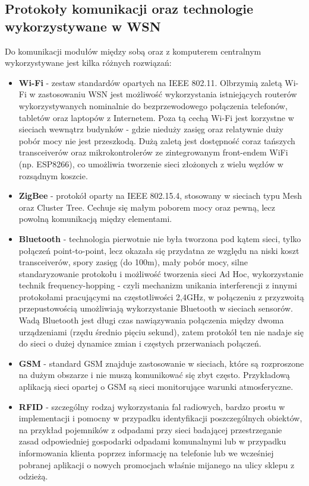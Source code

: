 \documentclass[12pt, twoside, hidelinks, a4paper]{article}
\begin{document}
\subsection{Protokoły komunikacji oraz technologie wykorzystywane w WSN}
Do komunikacji modułów między sobą oraz z komputerem centralnym wykorzystywane jest kilka różnych rozwiązań:
\begin{itemize}
\item \textbf{Wi-Fi}  - zestaw standardów opartych na IEEE 802.11. Olbrzymią zaletą Wi-Fi w zastosowaniu WSN jest możliwość wykorzystania istniejących routerów wykorzystywanych nominalnie do bezprzewodowego połączenia telefonów, tabletów oraz laptopów z Internetem. Poza tą cechą Wi-Fi jest korzystne w sieciach wewnątrz budynków - gdzie nieduży zasięg oraz relatywnie duży pobór mocy nie jest przeszkodą. Dużą zaletą jest dostępność coraz tańszych transceiverów oraz mikrokontrolerów ze zintegrowanym front-endem WiFi (np. ESP8266), co umożliwia tworzenie sieci złożonych z wielu węzłów w rozsądnym koszcie.\cite{c2}\cite{c14}\cite{c15}
\item \textbf{ZigBee} - protokół oparty na IEEE 802.15.4, stosowany w sieciach typu Mesh oraz Cluster Tree. Cechuje się małym poborem mocy oraz pewną, lecz powolną komunikacją między elementami.\cite{c6}\cite{c12}
\item \textbf{Bluetooth} - technologia pierwotnie nie była tworzona pod kątem sieci, tylko połączeń point-to-point, lecz okazała się przydatna ze względu na niski koszt transceiverów, spory zasięg (do 100m), mały pobór mocy, silne standaryzowanie protokołu i możliwość tworzenia sieci Ad Hoc, wykorzystanie technik frequency-hopping - czyli mechanizm unikania interferencji z innymi protokołami pracującymi na częstotliwości 2,4GHz, w połączeniu z przyzwoitą przepustowością umożliwiają wykorzystanie Bluetooth w sieciach sensorów. Wadą Bluetooth jest długi czas nawiązywania połączenia między dwoma urządzeniami (rzędu średnio pięciu sekund), zatem protokół ten nie nadaje się do sieci o dużej dynamice zmian i częstych przerwaniach połączeń.\cite{c7}\cite{c9}
\item \textbf{GSM} - standard GSM znajduje zastosowanie w sieciach, które są rozproszone na dużym obszarze i nie muszą komunikować się zbyt często. Przykładową aplikacją sieci opartej o GSM są sieci monitorujące warunki atmosferyczne\cite{c10}.
\item \textbf{RFID} - szczególny rodzaj wykorzystania fal radiowych, bardzo prostu w implementacji i pomocny w przypadku identyfikacji poszczególnych obiektów, na przykład pojemników z odpadami przy sieci badającej przestrzeganie zasad odpowiedniej gospodarki odpadami komunalnymi lub  w przypadku informowania klienta poprzez informację na telefonie lub we wcześniej pobranej aplikacji o nowych promocjach właśnie mijanego na ulicy sklepu z odzieżą.

\end{itemize}
\end{document}
